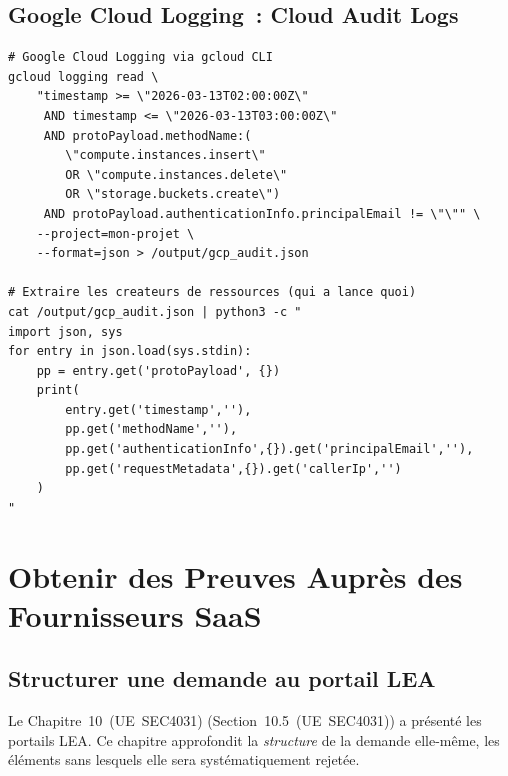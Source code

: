 \subsection{Google Cloud Logging~: Cloud Audit Logs}

\begin{lstlisting}[language=bash_forensique,
    caption={Google Cloud Audit Logs, analyse forensique}]
# Google Cloud Logging via gcloud CLI
gcloud logging read \
    "timestamp >= \"2026-03-13T02:00:00Z\"
     AND timestamp <= \"2026-03-13T03:00:00Z\"
     AND protoPayload.methodName:(
        \"compute.instances.insert\"
        OR \"compute.instances.delete\"
        OR \"storage.buckets.create\")
     AND protoPayload.authenticationInfo.principalEmail != \"\"" \
    --project=mon-projet \
    --format=json > /output/gcp_audit.json

# Extraire les createurs de ressources (qui a lance quoi)
cat /output/gcp_audit.json | python3 -c "
import json, sys
for entry in json.load(sys.stdin):
    pp = entry.get('protoPayload', {})
    print(
        entry.get('timestamp',''),
        pp.get('methodName',''),
        pp.get('authenticationInfo',{}).get('principalEmail',''),
        pp.get('requestMetadata',{}).get('callerIp','')
    )
"
\end{lstlisting}

\section{Obtenir des Preuves Auprès des Fournisseurs SaaS}
\label{sec:preuve-saas}

\subsection{Structurer une demande au portail LEA}

Le Chapitre~10~(UE~SEC4031) (Section~10.5~(UE~SEC4031)) a
présenté les portails LEA. Ce chapitre approfondit la \emph{structure}
de la demande elle-même, les éléments sans lesquels elle sera
systématiquement rejetée.

